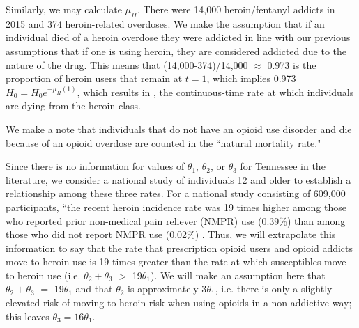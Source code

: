 \documentclass[12pt]{article}
\begin{document}
Similarly, we may calculate $\mu_{H}$. There were 14,000 heroin/fentanyl addicts in 2015 and 374 heroin-related overdoses. We make the assumption that if an individual died of a heroin overdose they were addicted in line with our previous assumptions that if one is using heroin, they are considered addicted due to the nature of the drug. This means that (14,000-374)/14,000 $\approx$ 0.973 is the proportion of heroin users that remain at $t=1$, which implies 0.973$H_0=H_0 e^{-\mu_{H}(1)}$, which results in  \unboldmath, the continuous-time rate at which individuals are dying from the heroin class.


We make a note that individuals that do not have an opioid use disorder and die because of an opioid overdose are counted in the ``natural mortality rate." 
\pagebreak


Since there is no information for values of $\theta_1$, $\theta_2$, or $\theta_3$ for Tennessee in the literature, we consider a national study of individuals 12 and older to establish a relationship among these three rates. For a national study consisting of 609,000 participants, ``the recent heroin incidence rate was 19 times higher among those who reported prior non-medical pain reliever (NMPR) use (0.39\%) than among those who did not report NMPR use (0.02\%) \cite{Muhuri}.
Thus, we will extrapolate this information to say that the rate that prescription opioid users and opioid addicts move to heroin use is 19 times greater than the rate at which susceptibles move to heroin use (i.e. $\theta_2 + \theta_3$ $>$ 19$\theta_1$). We will make an assumption here that $\theta_2 + \theta_3$ $=$ 19$\theta_1$ and that $\theta_2$ is approximately 3$\theta_1$, i.e. there is only a slightly elevated risk of moving to heroin risk when using opioids in a non-addictive way; this leaves $\theta_3=16\theta_1.$ \\
\end{document}
